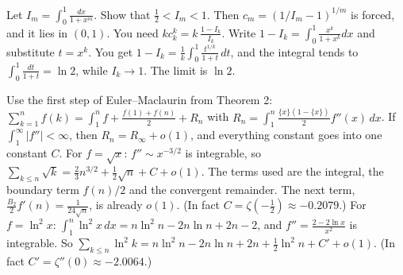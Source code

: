 \documentclass[11pt,a4paper]{article}
\begin{document}
 Let $I_m=\int_0^1\frac{dx}{1+x^m}$. Show that $\frac12<I_m<1$. Then $c_m=(1/I_m-1)^{1/m}$ is forced, and it lies in $(0,1)$.
 You need $kc_k^k=k\,\frac{1-I_k}{I_k}$. Write $1-I_k=\int_0^1\frac{x^k}{1+x^k}dx$ and substitute $t=x^k$.
 You get $1-I_k=\frac1k\int_0^1\frac{t^{1/k}}{1+t}\,dt$, and the integral tends to $\int_0^1\frac{dt}{1+t}=\ln2$, while $I_k\to1$. The limit is $\ln 2$.

 Use the first step of Euler--Maclaurin from Theorem 2: $\sum_{k=1}^n f(k)=\int_1^n f+\frac{f(1)+f(n)}2+R_n$ with $R_n=\int_1^n\frac{\{x\}(1-\{x\})}2f''(x)\,dx$. If $\int_1^\infty|f''|<\infty$, then $R_n=R_\infty+o(1)$, and everything constant goes into one constant $C$.
 For $f=\sqrt x$: $f''\sim x^{-3/2}$ is integrable, so $\sum_{k\le n}\sqrt k=\frac23n^{3/2}+\frac12\sqrt n+C+o(1)$. The terms used are the integral, the boundary term $f(n)/2$ and the convergent remainder. The next term, $\frac{B_2}{2}f'(n)=\frac1{24\sqrt n}$, is already $o(1)$. (In fact $C=\zeta(-\frac12)\approx-0.2079$.)
 For $f=\ln^2x$: $\int_1^n\ln^2x\,dx=n\ln^2n-2n\ln n+2n-2$, and $f''=\frac{2-2\ln x}{x^2}$ is integrable. So $\sum_{k\le n}\ln^2k=n\ln^2n-2n\ln n+2n+\frac12\ln^2n+C'+o(1)$. (In fact $C'=\zeta''(0)\approx-2.0064$.)
\end{document}
